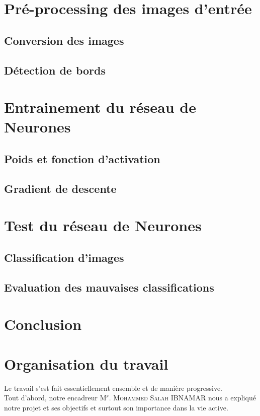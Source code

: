 \documentclass[a4paper,12pt]{report}
\begin{document}
\chapter{Pré-processing des images d'entrée}
\section{Conversion des images}
\section{Détection de bords}


\chapter{Entrainement du réseau de Neurones}
\section{Poids et fonction d'activation}
\section{Gradient de descente}


\chapter{Test du réseau de Neurones}
\section{Classification d'images}
\section{Evaluation des mauvaises classifications}


\chapter*{Conclusion}


\chapter*{Organisation du travail}
Le travail s’est fait essentiellement ensemble et de manière progressive.\\

Tout d’abord, notre encadreur M$^{r}$. \textsc{Mohammed Salah} IBNAMAR  nous a expliqué notre projet et ses objectifs et surtout son importance dans la vie active.\\
\end{document}
